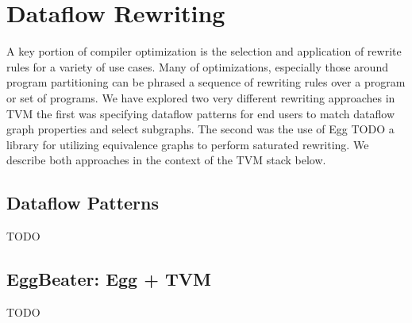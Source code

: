 \section{Dataflow Rewriting}

A key portion of compiler optimization is
  the selection and application of rewrite rules for a variety
  of use cases.
Many of optimizations, especially those around program partitioning can
  be phrased a sequence of rewriting rules over a program or set of
  programs.
We have explored two very different rewriting approaches in TVM
  the first was specifying dataflow patterns for end users to
  match dataflow graph properties and select subgraphs.
The second was the use of Egg TODO a library
  for utilizing equivalence graphs to perform saturated rewriting.
We describe both approaches in the context of the TVM stack
  below.

\subsection{Dataflow Patterns}
TODO

\subsection{EggBeater: Egg + TVM}
TODO
